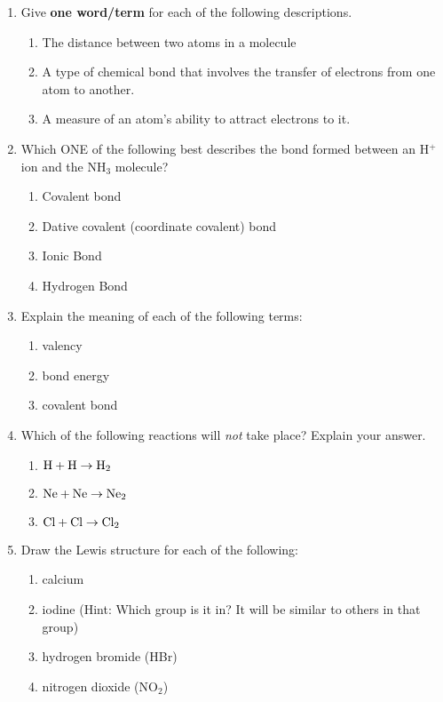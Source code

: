 \begin{eocexercises}{}

\begin{enumerate}

\item{Give \textbf{one word/term} for each of the following descriptions.}
\begin{enumerate}
\item{The distance between two atoms in a molecule}
\item{A type of chemical bond that involves the transfer of electrons from one atom to another.}
\item{A measure of an atom's ability to attract electrons to it.}
\end{enumerate}

\item{Which ONE of the following best describes the bond formed between an H$^+$ ion and the NH$_3$ molecule?}
\begin{enumerate}
\item{Covalent bond}
\item{Dative covalent (coordinate covalent) bond}
\item{Ionic Bond}
\item{Hydrogen Bond}
\end{enumerate}

\item{Explain the meaning of each of the following terms:}
\begin{enumerate}
\item{valency}
\item{bond energy}
\item{covalent bond}
\end{enumerate}

\item{Which of the following reactions will \textit{not} take place? Explain your answer.}
\begin{enumerate}
\item{$\rm{H + H \rightarrow H_{2}}$}
\item{$\rm{Ne + Ne \rightarrow Ne_{2}}$}
\item{$\rm{Cl + Cl \rightarrow Cl_{2}}$}
\end{enumerate}

\item{Draw the Lewis structure for each of the following:}
\begin{enumerate}
\item{calcium}
\item{iodine (Hint: Which group is it in? It will be similar to others in that group)}
\item{hydrogen bromide (HBr)}
\item{nitrogen dioxide (NO$_{2}$)}
\end{enumerate}


\end{enumerate}
\end{eocexercises}
